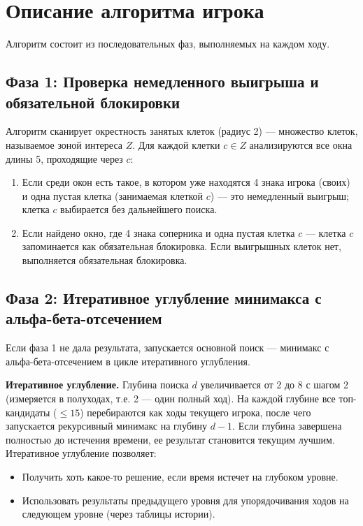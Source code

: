 \documentclass[a4paper,14pt]{extreport}
\begin{document}
\section{Описание алгоритма игрока}
Алгоритм состоит из последовательных фаз, выполняемых на каждом ходу.

\subsection{Фаза 1: Проверка немедленного выигрыша и обязательной блокировки}
Алгоритм сканирует окрестность занятых клеток (радиус 2) — множество клеток, называемое зоной интереса $Z$. Для каждой клетки $c \in Z$ анализируются все окна длины 5, проходящие через $c$:
\begin{enumerate}
    \item Если среди окон есть такое, в котором уже находятся 4 знака игрока (своих) и одна пустая клетка (занимаемая клеткой $c$) — это немедленный выигрыш; клетка $c$ выбирается без дальнейшего поиска.
    \item Если найдено окно, где 4 знака соперника и одна пустая клетка $c$ — клетка $c$ запоминается как обязательная блокировка. Если выигрышных клеток нет, выполняется обязательная блокировка.
\end{enumerate}

\subsection{Фаза 2: Итеративное углубление минимакса с альфа-бета-отсечением}
Если фаза 1 не дала результата, запускается основной поиск — минимакс с альфа-бета-отсечением в цикле итеративного углубления.

\textbf{Итеративное углубление.} Глубина поиска $d$ увеличивается от 2 до 8 с шагом 2 (измеряется в полуходах, т.е. 2 — один полный ход). На каждой глубине все топ-кандидаты ($\le 15$) перебираются как ходы текущего игрока, после чего запускается рекурсивный минимакс на глубину $d-1$. Если глубина завершена полностью до истечения времени, ее результат становится текущим лучшим. Итеративное углубление позволяет:
\begin{itemize}
    \item Получить хоть какое-то решение, если время истечет на глубоком уровне.
    \item Использовать результаты предыдущего уровня для упорядочивания ходов на следующем уровне (через таблицы истории).
\end{itemize}
\end{document}
